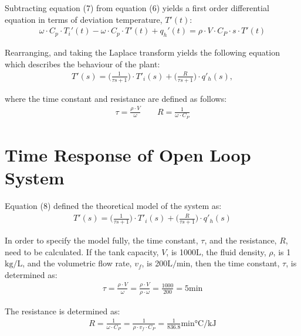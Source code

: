 \documentclass{article}
\begin{document}
Subtracting equation (7) from equation (6) yields a first order differential equation in terms of deviation temperature, $T'(t)$:
\begin{align*}
\omega \cdot C_p \cdot T_i'(t) - \omega \cdot C_p \cdot T'(t) + q_h'(t) = \rho \cdot V \cdot C_P \cdot s \cdot T'(t)
\end{align*}

Rearranging, and taking the Laplace transform yields the following equation which describes the behaviour of the plant:
\begin{align}
T'(s) = \bigg(\frac{1}{\tau s + 1}\bigg) \cdot T'_i(s) + \bigg(\frac{R}{\tau s + 1}\bigg) \cdot q'_h(s),
\end{align}

where the time constant and resistance are defined as follows:
\begin{align*}
\tau = \frac{\rho \cdot V}{\omega} \quad \quad R = \frac{1}{\omega \cdot C_P}
\end{align*}

\section{Time Response of Open Loop System}
Equation (8) defined the theoretical model of the system as:
\begin{align*}
T'(s) = \bigg(\frac{1}{\tau s + 1}\bigg) \cdot T'_i(s) + \bigg(\frac{R}{\tau s + 1}\bigg) \cdot q'_h(s)
\end{align*}

In order to specify the model fully, the time constant, $\tau$, and the resistance, $R$, need to be calculated. If the tank capacity, $V$, is 1000$\si{\liter}$, the fluid density, $\rho$, is 1$\si{\kilogram\per\liter}$, and the volumetric flow rate, $v_f$, is 200$\si{\liter\per\minute}$, then the time constant, $\tau$, is determined as:
\begin{align*}
\tau = \frac{\rho \cdot V}{\omega} = \frac{\rho \cdot V}{\rho \cdot \omega} = \frac{1000}{200} = 5\si{\minute}
\end{align*}

The resistance is determined as:
\begin{align*}
R = \frac{1}{\omega \cdot C_P} = \frac{1}{\rho \cdot v_f \cdot C_P} = \frac{1}{836.8}\si{\minute\degreeCelsius\per\kilo\joule}
\end{align*}
\end{document}
